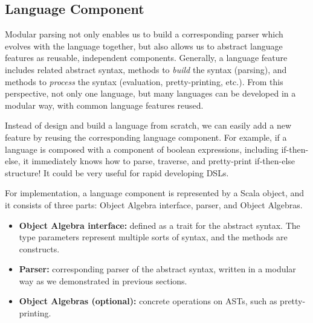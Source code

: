 \begin{comment}
It is natural to keep overriding existing parsers, whereas another potential use of this pattern is to reuse old versions of a parser. For instance,
we have a \lstinline{NewParser} that extends \lstinline{ExtParser}, with some more cases added, but for the lambda case we want to go back to the untyped one.
It can be achieved by instantiating an instance of \lstinline{BaseParser} to obtain the old \lstinline{pLam}. However, we must have \inlinecode{lazy} modifier for all the \inlinecode{pLam} starting from \inlinecode{BaseParser}.

\end{comment}

\subsection{Language Component}\label{subsec:language-component}

Modular parsing not only enables us to build a corresponding parser which evolves with the language together, but also allows us to abstract language features as reusable, independent components. Generally, a language feature includes related abstract syntax, methods to \textit{build} the syntax (parsing), and methods to \textit{process} the syntax (evaluation, pretty-printing, etc.). From this perspective, not only one language, but many languages can be developed in a modular way, with common language features reused.

Instead of design and build a language from scratch, we can easily add a new feature by reusing the corresponding language component. For example, if a language is composed with a component of boolean expressions, including if-then-else, it immediately knows how to parse, traverse, and pretty-print if-then-else structure! It could be very useful for rapid developing DSLs.

For implementation, a language component is represented by a Scala object, and it consists of three parts: Object Algebra interface, parser, and Object Algebras.

\begin{itemize}
    \item \textbf{Object Algebra interface:} defined as a trait for the abstract syntax. The type parameters represent multiple sorts of syntax, and the methods are constructs.
    \item \textbf{Parser:} corresponding parser of the abstract syntax, written in a modular way as we demonstrated in previous sections.
    \item \textbf{Object Algebras (optional):} concrete operations on ASTs, such as pretty-printing.
\end{itemize}

